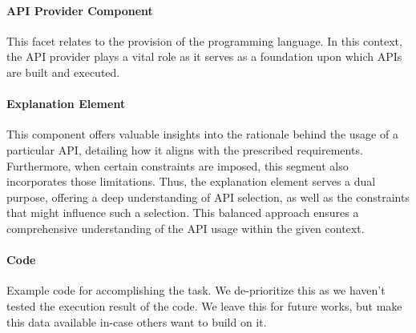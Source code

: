 \paragraph{API Provider Component} This facet relates to the provision of the programming language. In this context, the API provider plays a vital role as it serves as a foundation upon which APIs are built and executed.

\paragraph{Explanation Element} This component offers valuable insights into the rationale behind the usage of a particular API, detailing how it aligns with the prescribed requirements. Furthermore, when certain constraints are imposed, this segment also incorporates those limitations. Thus, the explanation element serves a dual purpose, offering a deep understanding of API selection, as well as the constraints that might influence such a selection. This balanced approach ensures a comprehensive understanding of the API usage within the given context.

\paragraph{Code} Example code for accomplishing the task. We de-prioritize this as we haven't tested the execution result of the code. We leave this for future works, but make this data available in-case others want to build on it.

